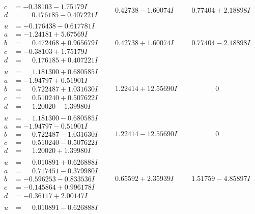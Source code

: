 \documentclass[1p]{elsarticle_modified}
\theoremstyle{definition}
\begin{document}
$$\begin{array}{c|c|c}
\begin{aligned}
c &= -0.38103 - 1.75179 I \\
d &= \phantom{-}0.176185 - 0.407221 I\end{aligned}
 & \phantom{-}0.42738 - 1.60074 I & \phantom{-}0.77404 + 2.18898 I \\ \hline\begin{aligned}
u &= -0.176438 - 0.617781 I \\
a &= -1.24181 + 5.67569 I \\
b &= \phantom{-}0.472468 + 0.965679 I \\
c &= -0.38103 + 1.75179 I \\
d &= \phantom{-}0.176185 + 0.407221 I\end{aligned}
 & \phantom{-}0.42738 + 1.60074 I & \phantom{-}0.77404 - 2.18898 I \\ \hline\begin{aligned}
u &= \phantom{-}1.181300 + 0.680585 I \\
a &= -1.94797 + 0.51901 I \\
b &= \phantom{-}0.722487 + 1.031630 I \\
c &= \phantom{-}0.510240 + 0.507622 I \\
d &= \phantom{-}1.20020 - 1.39980 I\end{aligned}
 & \phantom{-}1.22414 + 12.55690 I & \phantom{-0.000000 } 0 \\ \hline\begin{aligned}
u &= \phantom{-}1.181300 - 0.680585 I \\
a &= -1.94797 - 0.51901 I \\
b &= \phantom{-}0.722487 - 1.031630 I \\
c &= \phantom{-}0.510240 - 0.507622 I \\
d &= \phantom{-}1.20020 + 1.39980 I\end{aligned}
 & \phantom{-}1.22414 - 12.55690 I & \phantom{-0.000000 } 0 \\ \hline\begin{aligned}
u &= \phantom{-}0.010891 + 0.626888 I \\
a &= \phantom{-}0.717451 - 0.379980 I \\
b &= -0.596253 - 0.833536 I \\
c &= -0.145864 + 0.996178 I \\
d &= -0.36117 + 2.00147 I\end{aligned}
 & \phantom{-}0.65592 + 2.35939 I & \phantom{-}1.51759 - 4.85897 I \\ \hline\begin{aligned}
u &= \phantom{-}0.010891 - 0.626888 I \\

\end{aligned}
\end{array}$$
\end{document}

